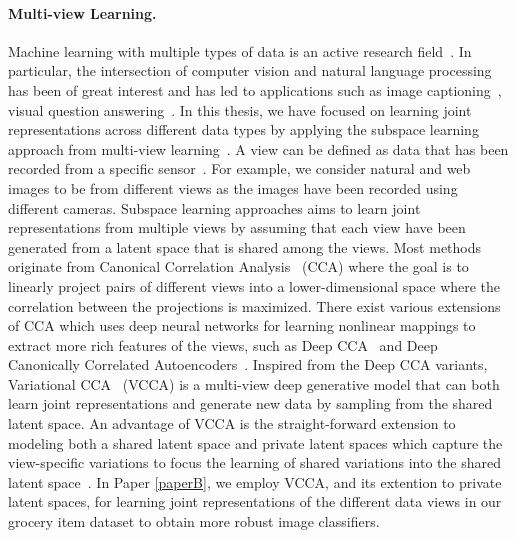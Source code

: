 \vspace{-3mm}
\paragraph{Multi-view Learning.} 
Machine learning with multiple types of data is an active research field~\cite{baltruvsaitis2018multimodal, xu2013survey}. In particular, the intersection of computer vision and natural language processing has been of great interest and has led to applications such as image captioning~\cite{xu2015show, lu2018neural, aneja2019sequential}, visual question answering~\cite{antol2015vqa, hudson2018compositional, hu2019language}.
In this thesis, we have focused on learning joint representations across different data types by applying the subspace learning approach from multi-view learning~\cite{xu2013survey}. A view can be defined as data that has been recorded from a specific sensor~\cite{salzmann2010factorized}. For example, we consider natural and web images to be from different views as the images have been recorded using different cameras. Subspace learning approaches aims to learn joint representations from multiple views by assuming that each view have been generated from a latent space that is shared among the views. Most methods originate from Canonical Correlation Analysis~\cite{hotelling1936relations} (CCA) where the goal is to linearly project pairs of different views into a lower-dimensional space where the correlation between the projections is maximized. 
There exist various extensions of CCA which uses deep neural networks for learning nonlinear mappings to extract more rich features of the views, such as Deep CCA~\cite{andrew2013deep} and Deep Canonically Correlated Autoencoders~\cite{wang2015deep}. Inspired from the Deep CCA variants, Variational CCA~\cite{wang2016deep} (VCCA) is a multi-view deep generative model that can both learn joint representations and generate new data by sampling from the shared latent space. 
An advantage of VCCA is the straight-forward extension to modeling both a shared latent space and private latent spaces which capture the view-specific variations to focus the learning of shared variations into the shared latent space~\cite{hyvarinen2000independent, salzmann2010factorized, tsai2018learning, wang2016deep, zhang2016inter, damianou2021multi}.
In Paper \ref{paperB}, we employ VCCA, and its extention to private latent spaces, for learning joint representations of the different data views in our grocery item dataset to obtain more robust image classifiers.   


